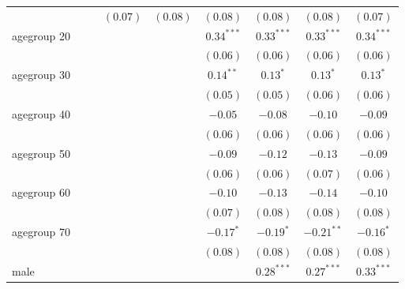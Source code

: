 \begin{table}
\begin{center}
\begin{tabular}{l c c c c c c c c}
                     &              &              & $(0.07)$     & $(0.08)$      & $(0.08)$      & $(0.08)$      & $(0.08)$      & $(0.07)$      \\
agegroup 20          &              &              &              &               & $0.34^{***}$  & $0.33^{***}$  & $0.33^{***}$  & $0.34^{***}$  \\
                     &              &              &              &               & $(0.06)$      & $(0.06)$      & $(0.06)$      & $(0.06)$      \\
agegroup 30          &              &              &              &               & $0.14^{**}$   & $0.13^{*}$    & $0.13^{*}$    & $0.13^{*}$    \\
                     &              &              &              &               & $(0.05)$      & $(0.05)$      & $(0.06)$      & $(0.06)$      \\
agegroup 40          &              &              &              &               & $-0.05$       & $-0.08$       & $-0.10$       & $-0.09$       \\
                     &              &              &              &               & $(0.06)$      & $(0.06)$      & $(0.06)$      & $(0.06)$      \\
agegroup 50          &              &              &              &               & $-0.09$       & $-0.12$       & $-0.13$       & $-0.09$       \\
                     &              &              &              &               & $(0.06)$      & $(0.06)$      & $(0.07)$      & $(0.06)$      \\
agegroup 60          &              &              &              &               & $-0.10$       & $-0.13$       & $-0.14$       & $-0.10$       \\
                     &              &              &              &               & $(0.07)$      & $(0.08)$      & $(0.08)$      & $(0.08)$      \\
agegroup 70          &              &              &              &               & $-0.17^{*}$   & $-0.19^{*}$   & $-0.21^{**}$  & $-0.16^{*}$   \\
                     &              &              &              &               & $(0.08)$      & $(0.08)$      & $(0.08)$      & $(0.08)$      \\
male                 &              &              &              &               &               & $0.28^{***}$  & $0.27^{***}$  & $0.33^{***}$  \\

\end{tabular}
\end{center}
\end{table}
